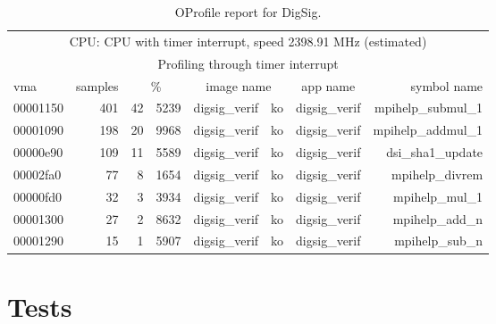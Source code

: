 \documentclass{article}
\begin{document}
\begin{table}[ht]
\begin{center}
\begin{tabular}{l r r @{.} l r @{.} l c r}
\multicolumn{8}{c}{CPU: CPU with timer interrupt, speed 2398.91 MHz (estimated)} \\
\multicolumn{8}{c}{Profiling through timer interrupt} \\
vma & samples & \multicolumn{2}{c}{\%} & \multicolumn{2}{c}{image name} & app name & symbol name \\
00001150 & 401 & 42&5239 & digsig\_verif&ko & digsig\_verif & mpihelp\_submul\_1 \\
00001090 & 198 & 20&9968 & digsig\_verif&ko & digsig\_verif & mpihelp\_addmul\_1 \\
00000e90 & 109 & 11&5589 & digsig\_verif&ko & digsig\_verif & dsi\_sha1\_update \\
00002fa0 & 77 & 8&1654 & digsig\_verif&ko & digsig\_verif & mpihelp\_divrem \\
00000fd0 & 32 & 3&3934 & digsig\_verif&ko & digsig\_verif & mpihelp\_mul\_1 \\
00001300 & 27 & 2&8632 & digsig\_verif&ko & digsig\_verif & mpihelp\_add\_n \\
00001290 & 15 & 1&5907 & digsig\_verif&ko & digsig\_verif & mpihelp\_sub\_n \\
\end{tabular}
\caption{OProfile report for DigSig.}
\label{tab:Oprofile}
\end{center}
\end{table} 


\section{Tests}
\end{document}
